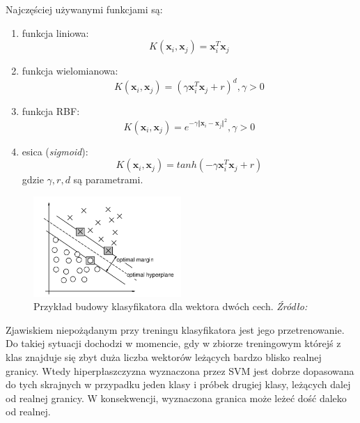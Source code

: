 Najczęściej używanymi funkcjami są:
\begin{enumerate}[label=\arabic*)]
  \item \rule{0pt}{1pt}\vspace*{-12pt}
  funkcja liniowa:
    \begin{equation*} 
     K(\bm{x}_i, \bm{x}_j) = \bm{x}_i^T\bm{x}_j
    \end{equation*}
  \item \rule{0pt}{1pt}\vspace*{-12pt}
  funkcja wielomianowa:
    \begin{equation*} 
     K(\bm{x}_i, \bm{x}_j) = (\gamma\bm{x}_i^T\bm{x}_j+r)^d,  \gamma > 0
    \end{equation*}
  \item \rule{0pt}{1pt}\vspace*{-12pt}
  funkcja RBF:
    \begin{equation*} 
    K(\bm{x}_i, \bm{x}_j) = e^{-\gamma\Vert\bm{x}_i-\bm{x}_j\Vert^2},  \gamma > 0
    \end{equation*}
  \item \rule{0pt}{1pt}\vspace*{-12pt}
  esica (\textit{sigmoid}):
    \begin{equation*} 
    K(\bm{x}_i, \bm{x}_j) = tanh(-\gamma\bm{x}_i^T\bm{x}_j+r)
    \end{equation*}
  	gdzie $\gamma, r, d$ są parametrami.
\end{enumerate}

\begin{figure}[htb]
\centering
\includegraphics[width=0.5\textwidth]{ch3_svm.png}
\caption{Przykład budowy klasyfikatora dla wektora dwóch cech. \textit{Źródło: \cite{Cortes95}}}
\label{fig:svm}
\end{figure}

Zjawiskiem niepożądanym przy treningu klasyfikatora jest jego przetrenowanie. Do takiej sytuacji dochodzi w momencie, gdy w zbiorze treningowym którejś z klas znajduje się zbyt duża liczba wektorów leżących bardzo blisko realnej granicy. Wtedy hiperpłaszczyzna wyznaczona przez SVM jest dobrze dopasowana do tych skrajnych w przypadku jeden klasy i próbek drugiej klasy, leżących dalej od realnej granicy. W konsekwencji, wyznaczona granica może leżeć dość daleko od realnej.


